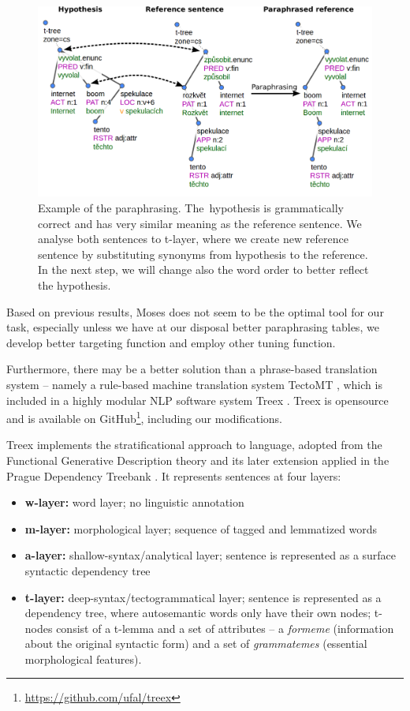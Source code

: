 \documentclass[11pt]{article}
\def\footurl#1{\footnote{\url{#1}}}
\begin{document}
\begin{figure}[tb]
\begin{center}
\includegraphics[scale=0.4]{example.png} 

\caption{Example of the paraphrasing. The~hypothesis is grammatically correct 
and has very similar meaning as the reference sentence.  We analyse both 
sentences to t-layer, where we create new reference sentence by substituting
synonyms from hypothesis to the reference. In the next step, we will change also
the word order to better reflect the hypothesis.}
\label{example}
\end{center}
\end{figure}

Based on previous results, Moses does not seem to be the optimal tool for our 
task, especially unless we have at our disposal better paraphrasing tables,
we develop better targeting function and employ other tuning function. 

Furthermore, there may be a better solution than a phrase-based translation
system -- namely a rule-based machine translation system TectoMT \cite{tectomt},
which is included in a highly modular NLP software system Treex \cite{treex}.
Treex is opensource and is available on 
GitHub\footurl{https://github.com/ufal/treex}, including our modifications. 

Treex implements the stratificational approach to language, adopted from the 
Functional Generative Description theory \cite{FGP} and its later extension 
applied in the Prague Dependency Treebank \cite{PDT3.0}. It represents 
sentences at four layers: 
\begin{itemize}
\item \textbf{w-layer:} word layer; no linguistic annotation
\item \textbf{m-layer:} morphological layer; sequence of tagged and lemmatized 
words
\item \textbf{a-layer:} shallow-syntax/analytical layer; sentence is 
represented as a surface syntactic dependency tree
\item \textbf{t-layer:} deep-syntax/tectogrammatical layer; sentence is 
represented as a dependency tree, where autosemantic words only have their own 
nodes; t-nodes consist of a t-lemma and a set of attributes -- a \textit{formeme} 
(information about the original syntactic form) and a set of \textit{grammatemes} 
(essential morphological features).
\end{itemize} 
\end{document}
